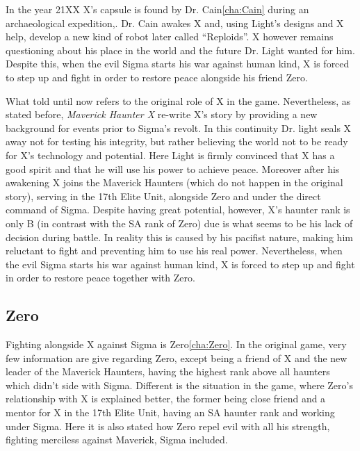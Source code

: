 In the year 21XX X's capsule is found by Dr. Cain\ref{cha:Cain} during an archaeological expedition\cite{X:Manual},\cite{wiki:Cain_journal}. Dr. Cain awakes X and, using Light's designs and X help, develop a new kind of robot later called ``Reploids''. X however remains questioning about his place in the world and the future Dr. Light wanted for him. Despite this, when the evil Sigma starts his war against human kind, X is forced to step up and fight in order to restore peace alongside his friend Zero. 


What told until now refers to the original role of X in the \x game. Nevertheless, as stated before, \textit{Maverick Haunter X} re-write X's story by providing a new background for events prior to Sigma's revolt. In this continuity Dr. light seals X away not for testing his integrity, but rather believing the world not to be ready for X's technology and potential. Here Light is firmly convinced that X has a good spirit and that he will use his power to achieve peace\cite{wiki:MM_MHX_X}. Moreover after his awakening X joins the Maverick Haunters (which do not happen in the original story), serving in the 17th Elite Unit, alongside Zero and under the direct command of Sigma. Despite having great potential, however, X's haunter rank is only B (in contrast with the SA rank of Zero) due is what seems to be his lack of decision during battle. In reality this is caused by his pacifist nature, making him reluctant to fight and preventing him to use his real power\cite{Xcoll1:Manual_X1}. Nevertheless, when the evil Sigma starts his war against human kind, X is forced to step up and fight in order to restore peace together with Zero.

\subsection{Zero}
Fighting alongside X against Sigma is Zero\ref{cha:Zero}. In the original \x game, very few information are give regarding Zero, except being a friend of X and the new leader of the Maverick Haunters\cite{X:Manual}, having the highest rank above all haunters which didn't side with Sigma. 
Different is the situation in the \mhx game, where Zero's relationship with X is explained better, the former being close friend and a mentor for X in the 17th Elite Unit, having an SA haunter rank and working under Sigma. Here it is also stated how Zero repel evil with all his strength, fighting merciless against Maverick, Sigma included\cite{Xcoll1:Manual_X1}.  

